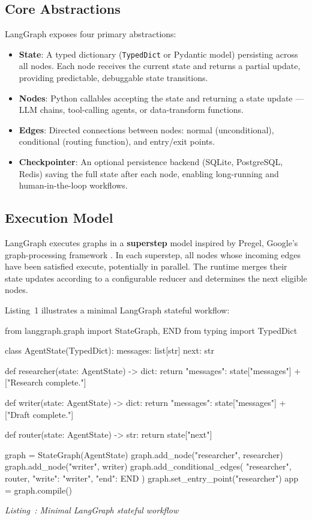 \documentclass[12pt,a4paper]{article}
\newcounter{codelisting}
\newcommand{\codecaption}[1]{%
    \refstepcounter{codelisting}%
    \begin{center}\small\textit{Listing~\thecodelisting: #1}\end{center}}
\begin{document}
\subsection{Core Abstractions}

LangGraph exposes four primary abstractions:

\begin{itemize}
    \item \textbf{State}: A typed dictionary (\texttt{TypedDict} or Pydantic
          model) persisting across all nodes. Each node receives the current
          state and returns a partial update, providing predictable,
          debuggable state transitions.

    \item \textbf{Nodes}: Python callables accepting the state and returning a
          state update --- LLM chains, tool-calling agents, or data-transform
          functions.

    \item \textbf{Edges}: Directed connections between nodes: normal
          (unconditional), conditional (routing function), and entry/exit points.

    \item \textbf{Checkpointer}: An optional persistence backend (SQLite,
          PostgreSQL, Redis) saving the full state after each node, enabling
          long-running and human-in-the-loop workflows.
\end{itemize}

\subsection{Execution Model}

LangGraph executes graphs in a \textbf{superstep} model inspired by Pregel,
Google's graph-processing framework \cite{LangGraph2023Docs}. In each
superstep, all nodes whose incoming edges have been satisfied execute,
potentially in parallel. The runtime merges their state updates according to
a configurable reducer and determines the next eligible nodes.

Listing~1 illustrates a minimal LangGraph stateful workflow:

\begin{CodeBlock}
from langgraph.graph import StateGraph, END
from typing import TypedDict

class AgentState(TypedDict):
    messages: list[str]
    next: str

def researcher(state: AgentState) -> dict:
    return {"messages": state["messages"] + ["Research complete."]}

def writer(state: AgentState) -> dict:
    return {"messages": state["messages"] + ["Draft complete."]}

def router(state: AgentState) -> str:
    return state["next"]

graph = StateGraph(AgentState)
graph.add_node("researcher", researcher)
graph.add_node("writer", writer)
graph.add_conditional_edges(
    "researcher", router, {"write": "writer", "end": END}
)
graph.set_entry_point("researcher")
app = graph.compile()
\end{CodeBlock}
\codecaption{Minimal LangGraph stateful workflow}\label{lst:langgraph}
\end{document}
